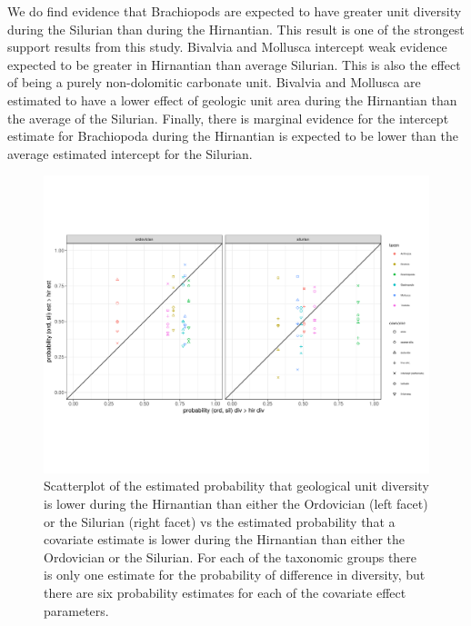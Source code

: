 \documentclass[12pt,letterpaper]{article}
\begin{document}
We do find evidence that Brachiopods are expected to have greater unit diversity during the Silurian than during the Hirnantian. This result is one of the strongest support results from this study. Bivalvia and Mollusca intercept weak evidence expected to be greater in Hirnantian than average Silurian. This is also the effect of being a purely non-dolomitic carbonate unit. Bivalvia and Mollusca are estimated to have a lower effect of geologic unit area during the Hirnantian than the average of the Silurian. Finally, there is marginal evidence for the intercept estimate for Brachiopoda during the Hirnantian is expected to be lower than the average estimated intercept for the Silurian.
\begin{figure}[ht]
  \centering
  \includegraphics[width=\textwidth,height=0.5\textheight,keepaspectratio=true]{figure/compare_pval_diversity}
  \caption{Scatterplot of the estimated probability that geological unit diversity is lower during the Hirnantian than either the Ordovician (left facet) or the Silurian (right facet) vs the estimated probability that a covariate estimate is lower during the Hirnantian than either the Ordovician or the Silurian. For each of the taxonomic groups there is only one estimate for the probability of difference in diversity, but there are six probability estimates for each of the covariate effect parameters. }
  \label{fig:pvalue}
\end{figure}
\end{document}
